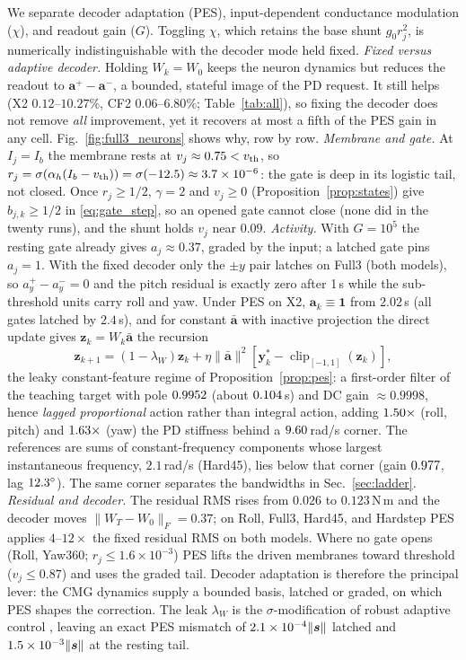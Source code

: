 \documentclass[letterpaper, 10 pt, conference]{ieeeconf}
\newcommand{\clip}{\operatorname{clip}}
\begin{document}
We separate decoder adaptation (PES), input-dependent conductance
modulation ($\chi$), and readout gain ($G$). Toggling $\chi$, which
retains the base shunt $g_0r_j^2$, is numerically indistinguishable with
the decoder mode held fixed. \emph{Fixed versus adaptive decoder.} Holding $W_k=W_0$ keeps the neuron
dynamics but reduces the readout to $\bm a^+-\bm a^-$, a bounded, stateful
image of the PD request. It still helps (X2 $0.12$--$10.27\%$, CF2
$0.06$--$6.80\%$; Table~\ref{tab:all}), so fixing the decoder does not
remove \emph{all} improvement, yet it recovers at most a fifth of the PES
gain in any cell. Fig.~\ref{fig:full3_neurons} shows why, row by row.
\emph{Membrane and gate.} At $I_j=I_b$ the membrane rests at
$v_j\approx0.75<v_{\rm th}$, so
$r_j=\sigma(\alpha_h(I_b-v_{\rm th}))=\sigma(-12.5)\approx3.7\times10^{-6}$:
the gate is deep in its logistic tail, not closed. Once $r_j\ge1/2$,
$\gamma=2$ and $v_j\ge0$ (Proposition~\ref{prop:states}) give
$b_{j,k}\ge1/2$ in \eqref{eq:gate_step}, so an opened gate cannot close
(none did in the twenty runs), and the shunt holds $v_j$ near $0.09$.
\emph{Activity.} With $G=10^5$ the resting gate already gives
$a_j\approx0.37$, graded by the input; a latched gate pins $a_j=1$. With
the fixed decoder only the $\pm y$ pair latches on Full3 (both models), so
$a^+_y-a^-_y=0$ and the pitch residual is exactly zero after 1\,s while
the sub-threshold units carry roll and yaw. Under PES on X2,
$\bm a_k\equiv\bm1$ from $2.02$\,s (all gates latched by $2.4$\,s), and
for constant $\bar{\bm a}$ with inactive projection the direct update
gives $\bm z_k=W_k\bar{\bm a}$ the recursion
\begin{equation}
 \bm z_{k+1}=(1-\lambda_W)\bm z_k
 +\eta\|\bar{\bm a}\|^2[\bm y_k^*-\clip_{[-1,1]}(\bm z_k)],
 \label{eq:constantbasis}
\end{equation}
the leaky constant-feature regime of Proposition~\ref{prop:pes}: a first-order filter of the
teaching target with pole $0.9952$ (about $0.104$\,s) and DC gain $\approx0.9998$, hence
\emph{lagged proportional} action rather than integral action, adding $1.50\times$
(roll, pitch) and $1.63\times$ (yaw) the PD stiffness behind a $9.60$\,rad/s
corner. The references are sums of constant-frequency components
\cite{sandoval2018instantaneous} whose largest instantaneous frequency, $2.1$\,rad/s (Hard45),
lies below that corner (gain $0.977$, lag $12.3^\circ$). The same corner
separates the bandwidths in Sec.~\ref{sec:ladder}.
\emph{Residual and decoder.} The residual RMS rises from $0.026$ to
$0.123$\,N\,m and the decoder moves $\|W_T-W_0\|_F=0.37$; on Roll, Full3,
Hard45, and Hardstep PES applies $4$--$12\times$ the fixed residual RMS on
both models. Where no gate opens (Roll, Yaw360; $r_j\le1.6\times10^{-3}$)
PES lifts the driven membranes toward threshold ($v_j\le0.87$) and uses
the graded tail. Decoder adaptation is therefore the principal lever: the
CMG dynamics supply a bounded basis, latched or graded, on which PES shapes the correction. The
leak $\lambda_W$ is the $\sigma$-modification of robust adaptive control
\cite{ioannou1984sigma,ioannou1996robust}, leaving an exact PES mismatch of
$2.1\times10^{-4}\|\bm s\|$ latched and $1.5\times10^{-3}\|\bm s\|$ at the resting tail.
\end{document}
